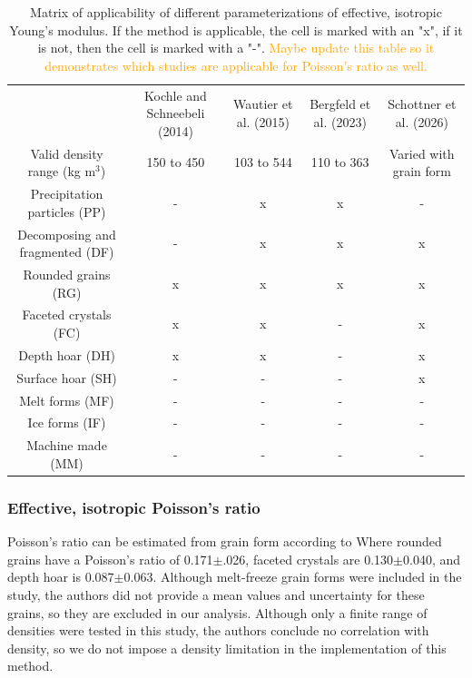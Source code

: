 \documentclass[journal abbreviation, manuscript]{copernicus}
\begin{document}
\begin{table}
    \centering
\caption{Matrix of applicability of different parameterizations of effective, isotropic Young's modulus. If the method is applicable, the cell is marked with an "x", if it is not, then the cell is marked with a "-". \textcolor{Orange}{Maybe update this table so it demonstrates which studies are applicable for Poisson's ratio as well.} }
\label{tab:E_applicability}
    \begin{tabular}{ccccc}
         &  Kochle and Schneebeli (2014)&  Wautier et al. (2015)& Bergfeld et al. (2023) & Schottner et al. (2026)\\
 Valid density range (kg m$^3$)& 150 to 450& 103 to 544&110 to 363 & Varied with grain form\\
         Precipitation particles (PP)&  -&  x& x&-\\
         Decomposing and fragmented (DF)&  -&  x& x&x\\
         Rounded grains (RG)&  x&  x& x&x\\
         Faceted crystals (FC)&  x&  x& -&x\\
 Depth hoar (DH)& x& x&-&x\\
 Surface hoar (SH)& -& -&-&x\\
 Melt forms (MF)& -& -&-&-\\
 Ice forms (IF)& -& -&-&-\\
 Machine made (MM)& -& -& -& -\\
    \end{tabular}
    
    
\end{table}

\FloatBarrier

\subsubsection{Effective, isotropic Poisson's ratio}

Poisson's ratio can be estimated from grain form according to \citet{kochle2014} Where rounded grains have a Poisson's ratio of 0.171$\pm$.026, faceted crystals are 0.130$\pm$0.040, and depth hoar is 0.087$\pm$0.063. Although melt-freeze grain forms were included in the study, the authors did not provide a mean values and uncertainty  for these grains, so they are excluded in our analysis. Although only a finite range of densities were tested in this study, the authors conclude no correlation with density, so we do not impose a density limitation in the implementation of this method.
\end{document}
